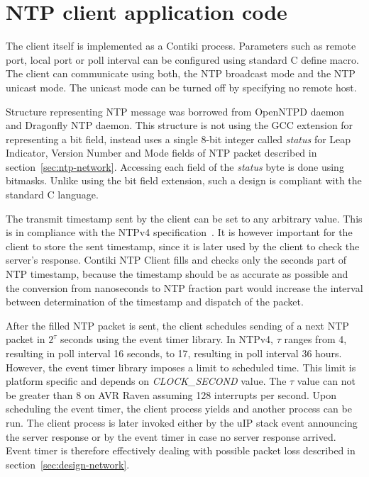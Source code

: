
\section{NTP client application code}
The client itself is implemented as a Contiki process.
Parameters such as remote port, local port or poll interval
can be configured using standard C define macro.
The client can communicate using both,
the NTP broadcast mode and the NTP unicast mode.
The unicast mode can be turned off by specifying no remote host.

Structure representing NTP message was borrowed from OpenNTPD daemon
and Dragonfly NTP daemon.
This structure is not using the GCC extension for representing a bit field,
instead uses a single 8-bit integer called {\it{status}}
for Leap Indicator, Version Number and Mode fields of NTP packet
described in section~\ref{sec:ntp-network}.
Accessing each field of the {\it{status}} byte is done using bitmasks.
Unlike using the bit field extension,
such a design is compliant with the standard C language.



The transmit timestamp sent by the client can be set to any arbitrary value.
This is in compliance with the NTPv4 specification~\cite{rfc5905}.
It is however important for the client to store the sent timestamp,
since it is later used by the client to check the server's response.
Contiki NTP Client fills and checks only the seconds part of NTP timestamp,
because the timestamp should be as accurate as possible and the
conversion from nanoseconds to NTP fraction part would increase the interval
between determination of the timestamp and dispatch of the packet.

After the filled NTP packet is sent, the client schedules
sending of a next NTP packet in $2^{\tau}$ seconds
using the event timer library.
In NTPv4, $\tau$ ranges from 4, resulting in poll interval 16 seconds,
to 17, resulting in poll interval 36 hours.
However, the event timer library imposes a limit to scheduled time.
This limit is platform specific and depends on {\it{CLOCK\_SECOND}} value.
The $\tau$ value can not be greater than 8 on AVR Raven assuming 128 interrupts per second.
Upon scheduling the event timer, the client process yields
and another process can be run.
The client process is later invoked either by the uIP stack event
announcing the server response
or by the event timer in case no server response arrived.
Event timer is therefore effectively
dealing with possible packet loss described in section~\ref{sec:design-network}.

